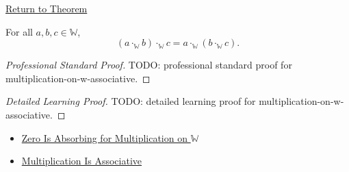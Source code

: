 \newpage
{}
\label{prf:multiplication-on-w-associative}

\begin{remark*}[Return]
\hyperref[thm:multiplication-on-w-associative]{Return to Theorem}
\end{remark*}

\begin{theorem*}
For all $a,b,c\in\mathbb{W}$,
\[
(a\cdot_{\mathbb{W}}b)\cdot_{\mathbb{W}}c
=
a\cdot_{\mathbb{W}}(b\cdot_{\mathbb{W}}c).
\]
\end{theorem*}

\begin{proof}[Professional Standard Proof]
\LRAProofBodyStart
TODO: professional standard proof for multiplication-on-w-associative.
\end{proof}

\begin{proof}[Detailed Learning Proof]
\LRAProofBodyStart
TODO: detailed learning proof for multiplication-on-w-associative.
\end{proof}

\begin{remark*}
\end{remark*}

\begin{dependencies}
\begin{itemize}
  \item \hyperref[thm:zero-absorbing-for-multiplication-on-w]{Zero Is Absorbing for Multiplication on $\mathbb{W}$}
  \item \hyperref[thm:multiplication-associative]{Multiplication Is Associative}
\end{itemize}
\end{dependencies}

\clearpage
